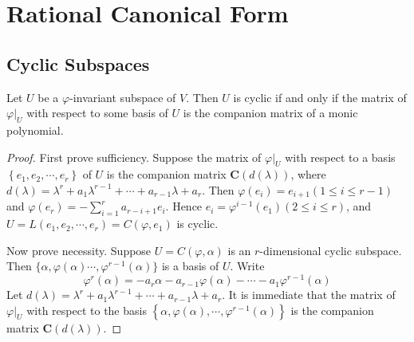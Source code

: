 \documentclass[12pt, a4paper, oneside]{book}
\begin{document}
\section{Rational Canonical Form}
\subsection{Cyclic Subspaces}
\begin{theorem}
    Let $U$ be a $\varphi$-invariant subspace of $V$. Then $U$ is cyclic if and only if the matrix of $\left.\varphi\right|_U$ with respect to some basis of $U$ is the companion matrix of a monic polynomial.
    \begin{proof}
        First prove sufficiency. Suppose the matrix of $\left.\varphi\right|_U$ with respect to a basis $\left\{e_1, e_2, \cdots, e_r\right\}$ of $U$ is the companion matrix $\mathbf{C}(d(\lambda))$, where $d(\lambda)=\lambda^r+a_1 \lambda^{r-1}+\cdots+a_{r-1} \lambda+a_r$. Then
        ${\varphi}\left({e}_i\right)={e}_{i+1}(1 \leq i \leq r-1)$ and ${\varphi}\left({e}_r\right)=-\sum_{i=1}^r a_{r-i+1} {e}_i$. Hence ${e}_i={\varphi}^{i-1}\left({e}_1\right)(2 \leq i \leq r)$, and $U=L\left({e}_1, {e}_2, \cdots, {e}_r\right)=C\left({\varphi}, {e}_1\right)$ is cyclic.

        Now prove necessity. Suppose $U=C({\varphi}, {\alpha})$ is an $r$-dimensional cyclic subspace. Then
        $\{{\alpha}, {\varphi}({\alpha}) \cdots, {\varphi}^{r-1}({\alpha})\}$ is a basis of $U$. Write
        \[
            {\varphi}^r({\alpha})=-a_r {\alpha}-a_{r-1} {\varphi}({\alpha})-\cdots-a_1 {\varphi}^{r-1}({\alpha})
        \]
        Let $d(\lambda)=\lambda^r+a_1 \lambda^{r-1}+\cdots+a_{r-1} \lambda+a_r$. It is immediate that the matrix of $\left.{\varphi}\right|_U$ with respect to the basis $\left\{{\alpha}, {\varphi}({\alpha}), \cdots, {\varphi}^{r-1}({\alpha})\right\}$ is the companion matrix $\mathbf{C}(d(\lambda))$.
    \end{proof}
\end{theorem}
\end{document}

